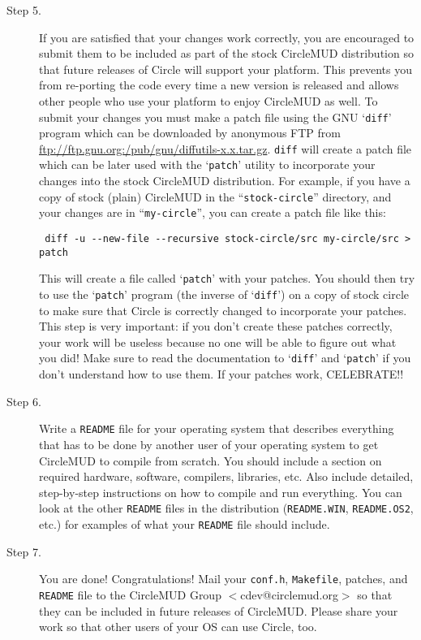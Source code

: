 \documentclass[11pt]{article}
\begin{document}
\begin{description}
\item[Step 5.] If you are satisfied that your changes work correctly, you are encouraged to submit them to be included as part of the stock CircleMUD distribution so that future releases of Circle will support your platform.  This prevents you from re-porting the code every time a new version is released and allows other people who use your platform to enjoy CircleMUD as well.\newline
To submit your changes you must make a patch file using the GNU `\texttt{diff}' program which can be downloaded by anonymous FTP from \url{ftp://ftp.gnu.org:/pub/gnu/diffutils-x.x.tar.gz}.  \texttt{diff} will create a patch file which can be later used with the `\texttt{patch}' utility to incorporate your changes into the stock CircleMUD distribution.  For example, if you have a copy of stock (plain) CircleMUD in the ``\texttt{stock-circle}'' directory, and your changes are in ``\texttt{my-circle}'', you can create a patch file like this:
\begin{verbatim}
 diff -u --new-file --recursive stock-circle/src my-circle/src > patch
\end{verbatim}
This will create a file called `\texttt{patch}' with your patches.  You should then try to use the `\texttt{patch}' program (the inverse of `\texttt{diff}') on a copy of stock circle to make sure that Circle is correctly changed to incorporate your patches.\newline
This step is very important: if you don't create these patches correctly, your work will be useless because no one will be able to figure out what you did!  Make sure to read the documentation to `\texttt{diff}' and `\texttt{patch}' if you don't understand how to use them.\newline
If your patches work, CELEBRATE!!

\item[Step 6.] Write a \texttt{README} file for your operating system that describes everything that has to be done by another user of your operating system to get CircleMUD to compile from scratch.  You should include a section on required hardware, software, compilers, libraries, etc. Also include detailed, step-by-step instructions on how to compile and run everything.  You can look at the other \texttt{README} files in the distribution (\texttt{README.WIN}, \texttt{README.OS2}, etc.) for examples of what your \texttt{README} file should include.

\item[Step 7.] You are done!  Congratulations!  Mail your \texttt{conf.h}, \texttt{Makefile}, patches,
and \texttt{README} file to the CircleMUD Group $<$cdev@circlemud.org$>$ so that they can be included in future releases of CircleMUD.  Please share your work so that other users of your OS can use Circle, too.
\end{description}
\end{document}
